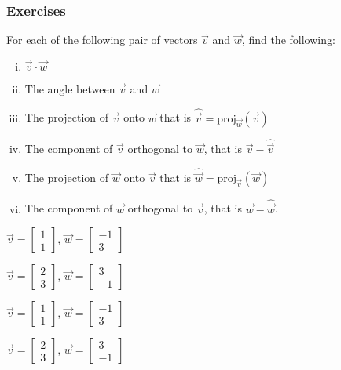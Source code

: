 \subsubsection{Exercises}
\begin{exercise}
For each of the following pair of vectors $\vec{v}$ and $\vec{w}$, find the following:
\begin{enumerate}[i.]
\item $\vec{v}\cdot \vec{w}$
\item The angle between $\vec{v}$ and $\vec{w}$
\item The projection of $\vec{v}$ onto $\vec{w}$ that is $\hat{\vec{v}}=\text{proj}_\vec{w}(\vec{v})$
\item The component of $\vec{v}$ orthogonal to $\vec{w}$, that is $\vec{v}-\hat{\vec{v}}$
\item The projection of $\vec{w}$ onto $\vec{v}$ that is $\hat{\vec{w}}=\text{proj}_\vec{v}(\vec{w})$
\item The component of $\vec{w}$ orthogonal to $\vec{v}$, that is $\vec{w}-\hat{\vec{w}}$.
\end{enumerate}
\begin{inparaenum}[a)]
\item $\vec{v}=\begin{bmatrix}1 \\ 1 \end{bmatrix}$, $\vec{w}=\begin{bmatrix}-1 \\ 3 \end{bmatrix}$ \hfill
\item $\vec{v}=\begin{bmatrix}2 \\ 3 \end{bmatrix}$, $\vec{w}=\begin{bmatrix} 3 \\ -1 \end{bmatrix}$ \hfill {} \\
\item $\vec{v}=\begin{bmatrix}1 \\ 1 \end{bmatrix}$, $\vec{w}=\begin{bmatrix}-1 \\ 3 \end{bmatrix}$ \hfill
\item $\vec{v}=\begin{bmatrix}2 \\ 3 \end{bmatrix}$, $\vec{w}=\begin{bmatrix} 3 \\ -1 \end{bmatrix}$ \hfill {} \\

\end{inparaenum}
\end{exercise}
